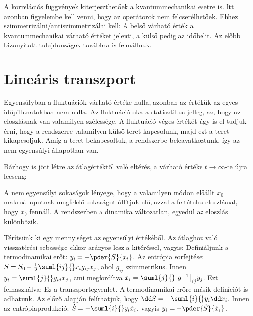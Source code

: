   A korrelációs függvények kiterjeszthetőek a kvantummechanikai esetre is.
   Itt azonban figyelembe kell venni, hogy az operátorok nem felcserélhetőek.
   Ehhez szimmetrizálni/antiszimmetrizálni kell:
  A belső várható érték a kvantummechanikai várható értéket jelenti, a külső pedig az időbelit.
   Az előbb bizonyított tulajdonságok továbbra is fennállnak. 
  
 \section{Lineáris transzport}
  
  Egyensúlyban a fluktuációk várható értéke nulla, azonban az értékük az egyes időpillanatokban nem nulla.
   Az fluktuáció oka a statisztikus jelleg, az, hogy az eloszlásnak van valamilyen szélessége.
   A fluktuáció véges értékét úgy is el tudjuk érni, hogy a rendszerre valamilyen külső teret kapcsolunk, majd ezt a teret kikapcsoljuk.
   Amíg a teret bekapcsoltuk, a rendszerbe beleavatkoztunk, így az nem-egyensúlyi állapotban van.
  
  Bárhogy is jött létre az átlagértéktől való eltérés, a várható értéke $t\to\infty$-re újra lecseng:
  
  A nem egyensúlyi sokaságok lényege, hogy a valamilyen módon előállt $x_0$ makroállapotnak megfelelő sokaságot állítjuk elő, azzal a feltételes eloszlással, hogy $x_0$ fennáll.
   A rendszerben a dinamika változatlan, egyedül az eloszlás különbözik. 
  
  Térítsünk ki egy mennyiséget az egyensúlyi értékéből.
   Az átlaghoz való visszatérési sebessége ekkor arányos lesz a kitéréssel, vagyis:
  Definiáljunk a termodinamikai erőt: $y_i=-\pder{S}{x_i}$.
   Az entrópia sorfejtése: $S=S_0-\frac{1}{2}\suml{ij}{}x_ig_{ij}x_j$, ahol $g_{ij}$ szimmetrikus.
   Innen $y_i=\suml{j}{}g_{ij}x_j$, ami megfordítva $x_i=\suml{j}{}\big[g^{-1}\big]_{ij}y_j$.
   Ezt felhasználva:
  Ez a transzportegyenlet.
   A termodinamikai erőre másik definíciót is adhatunk.
   Az előző alapján felírhatjuk, hogy $\dd S=-\suml{i}{}y_i\dd x_i$.
   Innen az entrópiaprodukció: $\dot S=-\suml{i}{}y_i\dot x_i$, vagyis $y_i=-\pder{\dot S}{\dot x_i}$. 
  
